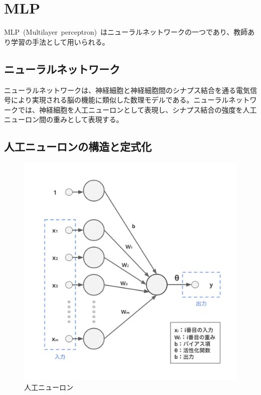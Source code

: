 
\section{MLP}

MLP~(Multilayer~perceptron)~はニューラルネットワークの一つであり、教師あり学習の手法として用いられる。

\subsection{ニューラルネットワーク}

ニューラルネットワークは、神経細胞と神経細胞間のシナプス結合を通る電気信号により実現される脳の機能に類似した数理モデルである。ニューラルネットワークでは、神経細胞を人工ニューロンとして表現し、シナプス結合の強度を人工ニューロン間の重みとして表現する。

\subsection{人工ニューロンの構造と定式化}
\label{subsec:neuron}

\begin{figure}[b]
\begin{center}
\includegraphics[width=0.7\hsize]{figure/neuron.png}
\caption{人工ニューロン}
\label{fig:neuron}
\end{center}
\end{figure}

